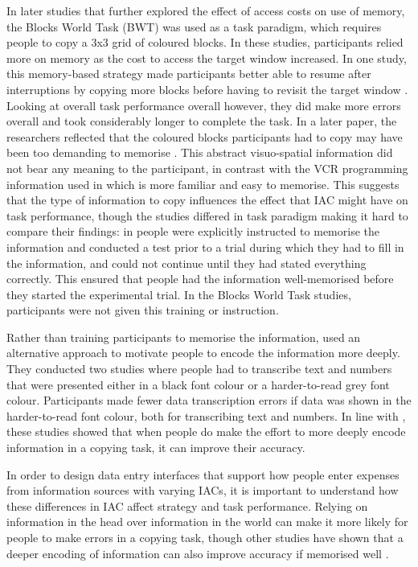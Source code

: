 \documentclass[11pt,oneside]{report}
\begin{document}
In later studies that further explored the effect of access costs on use of memory, the Blocks World Task (BWT) was used as a task paradigm, which requires people to copy a 3x3 grid of coloured blocks. In these studies, participants relied more on memory as the cost to access the target window increased. In one study, this memory-based strategy made participants better able to resume after interruptions by copying more blocks before having to revisit the target window \citep{Morgan2009}. Looking at overall task performance overall however, they did make more errors overall and took considerably longer to complete the task. In a later paper, the researchers reflected that the coloured blocks participants had to copy may have been too demanding to memorise \citep{Waldron2011}. This abstract visuo-spatial information did not bear any meaning to the participant, in contrast with the VCR programming information used in \citet{Gray2004} which is more familiar and easy to memorise. This suggests that the type of information to copy influences the effect that IAC might have on task performance, though the studies differed in task paradigm making it hard to compare their findings: in \citet{Gray2004} people were explicitly instructed to memorise the information and conducted a test prior to a trial during which they had to fill in the information, and could not continue until they had stated everything correctly. This ensured that people had the information well-memorised before they started the experimental trial. In the Blocks World Task studies, participants were not given this training or instruction.

Rather than training participants to memorise the information, \citet{Soboczenski2013} used an alternative approach to motivate people to encode the information more deeply. They conducted two studies where people had to transcribe text and numbers that were presented either in a black font colour or a harder-to-read grey font colour. Participants made fewer data transcription errors if data was shown in the harder-to-read font colour, both for transcribing text and numbers. In line with \citet{Gray2004}, these studies showed that when people do make the effort to more deeply encode information in a copying task, it can improve their accuracy.

In order to design data entry interfaces that support how people enter expenses from information sources with varying IACs, it is important to understand how these differences in IAC affect strategy and task performance. Relying on information in the head over information in the world can make it more likely for people to make errors in a copying task\citep{Morgan2009}, though other studies have shown that a deeper encoding of information can also improve accuracy if memorised well \citep{Gray2004, Soboczenski2013}. 
\end{document}
